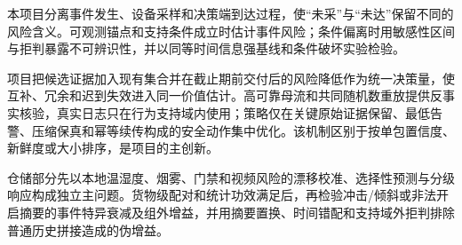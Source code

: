 \justifying
\NSFCBodyText


本项目分离事件发生、设备采样和决策端到达过程，使“未采”与“未达”保留不同的风险含义。可观测锚点和支持条件成立时估计事件风险；条件偏离时用敏感性区间与拒判暴露不可辨识性，并以同等时间信息强基线和条件破坏实验检验。


项目把候选证据加入现有集合并在截止期前交付后的风险降低作为统一决策量，使互补、冗余和迟到失效进入同一价值估计。高可靠母流和共同随机数重放提供反事实核验，真实日志只在行为支持域内使用；策略仅在关键原始证据保留、最低告警、压缩保真和幂等续传构成的安全动作集中优化。该机制区别于按单包置信度、新鲜度或大小排序，是项目的主创新。


仓储部分先以本地温湿度、烟雾、门禁和视频风险的漂移校准、选择性预测与分级响应构成独立主问题。货物级配对和统计功效满足后，再检验冲击/倾斜或非法开启摘要的事件特异衰减及组外增益，并用摘要置换、时间错配和支持域外拒判排除普通历史拼接造成的伪增益。
